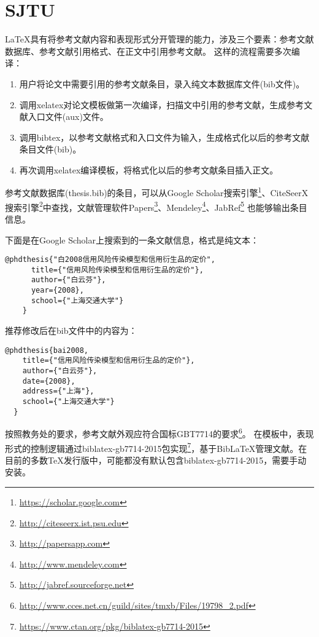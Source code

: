 \documentclass[twoside]{article}
\begin{document}
    \section*{SJTU}


 \LaTeX 具有将参考文献内容和表现形式分开管理的能力，涉及三个要素：参考文献数据库、参考文献引用格式、在正文中引用参考文献。
这样的流程需要多次编译：

\begin{enumerate}[noitemsep,topsep=0pt,parsep=0pt,partopsep=0pt]
\item 用户将论文中需要引用的参考文献条目，录入纯文本数据库文件(bib文件)。
\item 调用xelatex对论文模板做第一次编译，扫描文中引用的参考文献，生成参考文献入口文件(aux)文件。
\item 调用bibtex，以参考文献格式和入口文件为输入，生成格式化以后的参考文献条目文件(bib)。
\item 再次调用xelatex编译模板，将格式化以后的参考文献条目插入正文。
\end{enumerate}

参考文献数据库(thesis.bib)的条目，可以从Google Scholar搜索引擎\footnote{\url{https://scholar.google.com}}、CiteSeerX搜索引擎\footnote{\url{http://citeseerx.ist.psu.edu}}中查找，文献管理软件Papers\footnote{\url{http://papersapp.com}}、Mendeley\footnote{\url{http://www.mendeley.com}}、JabRef\footnote{\url{http://jabref.sourceforge.net}} 也能够输出条目信息。

下面是在Google Scholar上搜索到的一条文献信息，格式是纯文本：

\begin{lstlisting}[caption={从Google Scholar找到的参考文献条目}, label=googlescholar, escapeinside="", numbers=none]
    @phdthesis{"白2008信用风险传染模型和信用衍生品的定价",
      title={"信用风险传染模型和信用衍生品的定价"},
      author={"白云芬"},
      year={2008},
      school={"上海交通大学"}
    }
\end{lstlisting}

推荐修改后在bib文件中的内容为：

\begin{lstlisting}[caption={修改后的参考文献条目}, label=itemok, escapeinside="", numbers=none]
  @phdthesis{bai2008,
    title={"信用风险传染模型和信用衍生品的定价"},
    author={"白云芬"},
    date={2008},
    address={"上海"},
    school={"上海交通大学"}
  }
\end{lstlisting}

按照教务处的要求，参考文献外观应符合国标GBT7714的要求\footnote{\url{http://www.cces.net.cn/guild/sites/tmxb/Files/19798_2.pdf}}。
在模板中，表现形式的控制逻辑通过biblatex-gb7714-2015包实现\footnote{\url{https://www.ctan.org/pkg/biblatex-gb7714-2015}}，基于{Bib\LaTeX}管理文献。在目前的多数TeX发行版中，可能都没有默认包含biblatex-gb7714-2015，需要手动安装。
\end{document}
